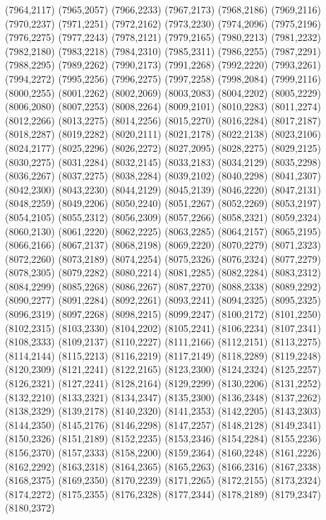 (7964,2117)
(7965,2057)
(7966,2233)
(7967,2173)
(7968,2186)
(7969,2116)
(7970,2237)
(7971,2251)
(7972,2162)
(7973,2230)
(7974,2096)
(7975,2196)
(7976,2275)
(7977,2243)
(7978,2121)
(7979,2165)
(7980,2213)
(7981,2232)
(7982,2180)
(7983,2218)
(7984,2310)
(7985,2311)
(7986,2255)
(7987,2291)
(7988,2295)
(7989,2262)
(7990,2173)
(7991,2268)
(7992,2220)
(7993,2261)
(7994,2272)
(7995,2256)
(7996,2275)
(7997,2258)
(7998,2084)
(7999,2116)
(8000,2255)
(8001,2262)
(8002,2069)
(8003,2083)
(8004,2202)
(8005,2229)
(8006,2080)
(8007,2253)
(8008,2264)
(8009,2101)
(8010,2283)
(8011,2274)
(8012,2266)
(8013,2275)
(8014,2256)
(8015,2270)
(8016,2284)
(8017,2187)
(8018,2287)
(8019,2282)
(8020,2111)
(8021,2178)
(8022,2138)
(8023,2106)
(8024,2177)
(8025,2296)
(8026,2272)
(8027,2095)
(8028,2275)
(8029,2125)
(8030,2275)
(8031,2284)
(8032,2145)
(8033,2183)
(8034,2129)
(8035,2298)
(8036,2267)
(8037,2275)
(8038,2284)
(8039,2102)
(8040,2298)
(8041,2307)
(8042,2300)
(8043,2230)
(8044,2129)
(8045,2139)
(8046,2220)
(8047,2131)
(8048,2259)
(8049,2206)
(8050,2240)
(8051,2267)
(8052,2269)
(8053,2197)
(8054,2105)
(8055,2312)
(8056,2309)
(8057,2266)
(8058,2321)
(8059,2324)
(8060,2130)
(8061,2220)
(8062,2225)
(8063,2285)
(8064,2157)
(8065,2195)
(8066,2166)
(8067,2137)
(8068,2198)
(8069,2220)
(8070,2279)
(8071,2323)
(8072,2260)
(8073,2189)
(8074,2254)
(8075,2326)
(8076,2324)
(8077,2279)
(8078,2305)
(8079,2282)
(8080,2214)
(8081,2285)
(8082,2284)
(8083,2312)
(8084,2299)
(8085,2268)
(8086,2267)
(8087,2270)
(8088,2338)
(8089,2292)
(8090,2277)
(8091,2284)
(8092,2261)
(8093,2241)
(8094,2325)
(8095,2325)
(8096,2319)
(8097,2268)
(8098,2215)
(8099,2247)
(8100,2172)
(8101,2250)
(8102,2315)
(8103,2330)
(8104,2202)
(8105,2241)
(8106,2234)
(8107,2341)
(8108,2333)
(8109,2137)
(8110,2227)
(8111,2166)
(8112,2151)
(8113,2275)
(8114,2144)
(8115,2213)
(8116,2219)
(8117,2149)
(8118,2289)
(8119,2248)
(8120,2309)
(8121,2241)
(8122,2165)
(8123,2300)
(8124,2324)
(8125,2257)
(8126,2321)
(8127,2241)
(8128,2164)
(8129,2299)
(8130,2206)
(8131,2252)
(8132,2210)
(8133,2321)
(8134,2347)
(8135,2300)
(8136,2348)
(8137,2262)
(8138,2329)
(8139,2178)
(8140,2320)
(8141,2353)
(8142,2205)
(8143,2303)
(8144,2350)
(8145,2176)
(8146,2298)
(8147,2257)
(8148,2128)
(8149,2341)
(8150,2326)
(8151,2189)
(8152,2235)
(8153,2346)
(8154,2284)
(8155,2236)
(8156,2370)
(8157,2333)
(8158,2200)
(8159,2364)
(8160,2248)
(8161,2226)
(8162,2292)
(8163,2318)
(8164,2365)
(8165,2263)
(8166,2316)
(8167,2338)
(8168,2375)
(8169,2350)
(8170,2239)
(8171,2265)
(8172,2155)
(8173,2324)
(8174,2272)
(8175,2355)
(8176,2328)
(8177,2344)
(8178,2189)
(8179,2347)
(8180,2372)
